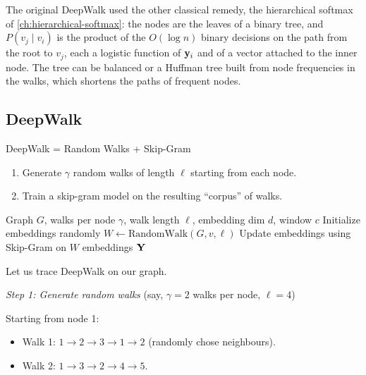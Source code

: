\begin{notechapter}
The original DeepWalk used the other classical remedy, the hierarchical softmax of \cref{ch:hierarchical-softmax}: the nodes are the leaves of a binary tree, and $P(v_j \mid v_i)$ is the product of the $O(\log n)$ binary decisions on the path from the root to $v_j$, each a logistic function of $\mathbf{y}_i$ and of a vector attached to the inner node. The tree can be balanced or a Huffman tree built from node frequencies in the walks, which shortens the paths of frequent nodes.

\subsection{DeepWalk}

\begin{definition}[DeepWalk]
DeepWalk = Random Walks + Skip-Gram
\begin{enumerate}
    \item Generate $\gamma$ random walks of length $\ell$ starting from each node.
    \item Train a skip-gram model on the resulting ``corpus'' of walks.
\end{enumerate}
\end{definition}

\begin{algorithm}
\caption{DeepWalk}
\begin{algorithmic}[1]
\Require Graph $G$, walks per node $\gamma$, walk length $\ell$, embedding dim $d$, window $c$
\State Initialize embeddings randomly
        \State $W \gets \text{RandomWalk}(G, v, \ell)$ 
        \State Update embeddings using Skip-Gram on $W$
    \EndFor
\EndFor
\State \Return embeddings $\mathbf{Y}$
\end{algorithmic}
\end{algorithm}

\begin{example}
Let us trace DeepWalk on our graph.

\emph{Step 1: Generate random walks} (say, $\gamma=2$ walks per node, $\ell=4$)

Starting from node 1:
\begin{itemize}
    \item Walk 1: $1 \to 2 \to 3 \to 1 \to 2$ (randomly chose neighbours).
    \item Walk 2: $1 \to 3 \to 2 \to 4 \to 5$.
\end{itemize}


\end{example}
\end{notechapter}
